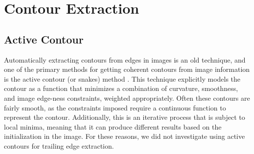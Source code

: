 

\section{Contour Extraction}

\subsection{Active Contour}

Automatically extracting contours from edges in images is an old technique, and one of the primary methods for getting coherent contours from image information is the active contour (or snakes) method \cite{amini1988using, kass1988snakes}.
This technique explicitly models the contour as a function that minimizes a combination of curvature, smoothness, and image edge-ness constraints, weighted appropriately.
Often these contours are fairly smooth, as the constraints imposed require a continuous function to represent the contour.
Additionally, this is an iterative process that is subject to local minima, meaning that it can produce different results based on the initialization in the image.
For these reasons, we did not investigate using active contours for trailing edge extraction.

